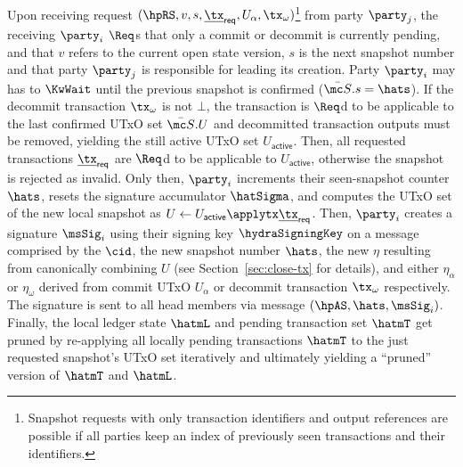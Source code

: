 \quad Upon receiving request
$(\hpRS,v,s,\underline{\tx}_{\mathsf{req}}, U_\alpha, \tx_\omega)$\footnote{Snapshot
  requests with only transaction identifiers and output references are possible
  if all parties keep an index of previously seen transactions and their
  identifiers.} from party $\party_j$, the receiving $\party_i$ $\Req$s
  that only a commit or decommit is currently pending, and that $v$ refers
to the current open state version, $s$ is the next snapshot number and that
party $\party_j$ is responsible for leading its creation.
Party $\party_i$ may has to $\KwWait$ until the previous snapshot is confirmed
($\bar{\mc S}.s = \hats$). If the decommit transaction $\tx_{\omega}$ is not $\bot$, the
transaction is $\Req$d to be applicable to the last confirmed UTxO set
$\bar{\mc S}.U$ and decommitted transaction outputs must be removed, yielding
the still active UTxO set $U_{\mathsf{active}}$. Then, all requested
transactions $\underline{\tx}_{\mathsf{req}}$ are $\Req$d to be applicable to
$U_{\mathsf{active}}$, otherwise the snapshot is rejected as invalid. Only then,
$\party_i$ increments their seen-snapshot counter $\hats$, resets the signature
accumulator $\hatSigma$, and computes the UTxO set of the new local snapshot as
$U \gets U_{\mathsf{active}} \applytx \underline{\tx}_{\mathsf{req}}$. Then,
$\party_i$ creates a signature $\msSig_i$ using their signing key
$\hydraSigningKey$ on a message comprised by the $\cid$, the new snapshot number
$\hats$, the new $\eta$ resulting from canonically combining $U$ (see
Section~\ref{sec:close-tx} for details), and either $\eta_{\alpha}$ or $\eta_{\omega}$ derived
from commit UTxO $U_{\alpha}$ or decommit transaction $\tx_{\omega}$ respectively. The
signature is sent to all head members via message $(\hpAS,\hats,\msSig_i)$.
Finally, the local ledger state $\hatmL$ and pending transaction set $\hatmT$
get pruned by re-applying all locally pending transactions $\hatmT$ to the just
requested snapshot's UTxO set iteratively and
ultimately yielding a ``pruned'' version of $\hatmT$ and $\hatmL$. \\

